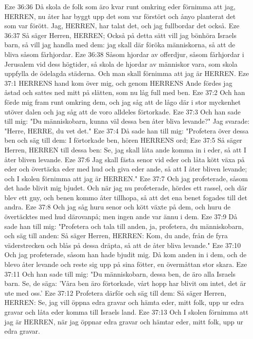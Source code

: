Eze 36:36  Då skola de folk som äro kvar runt omkring eder förnimma att jag, HERREN, nu åter har byggt upp det som var förstört och ånyo planterat det som var förött. Jag, HERREN, har talat det, och jag fullbordar det också.
Eze 36:37  Så säger Herren, HERREN; Också på detta sätt vill jag bönhöra Israels barn, så vill jag handla med dem: jag skall där föröka människorna, så att de bliva såsom fårhjordar.
Eze 36:38  Såsom hjordar av offerdjur, såsom fårhjordar i Jerusalem vid dess högtider, så skola de hjordar av människor vara, som skola uppfylla de ödelagda städerna. Och man skall förnimma att jag är HERREN.
Eze 37:1  HERRENS hand kom över mig, och genom HERRENS Ande fördes jag åstad och sattes ned mitt på slätten, som nu låg full med ben.
Eze 37:2  Och han förde mig fram runt omkring dem, och jag såg att de lågo där i stor myckenhet utöver dalen och jag såg att de voro alldeles förtorkade.
Eze 37:3  Och han sade till mig: "Du människobarn, kunna väl dessa ben åter bliva levande?" Jag svarade: "Herre, HERRE, du vet det."
Eze 37:4  Då sade han till mig: "Profetera över dessa ben och säg till dem: I förtorkade ben, hören HERRENS ord;
Eze 37:5  Så säger Herren, HERREN till dessa ben: Se, jag skall låta ande komma in i eder, så att I åter bliven levande.
Eze 37:6  Jag skall fästa senor vid eder och låta kött växa på eder och övertäcka eder med hud och giva eder ande, så att I åter bliven levande; och I skolen förnimma att jag är HERREN."
Eze 37:7  Och jag profeterade, såsom det hade blivit mig bjudet. Och när jag nu profeterade, hördes ett rassel, och där blev ett gny, och benen kommo åter tillhopa, så att det ena benet fogades till det andra.
Eze 37:8  Och jag såg huru senor och kött växte på dem, och huru de övertäcktes med hud därovanpå; men ingen ande var ännu i dem.
Eze 37:9  Då sade han till mig: "Profetera och tala till anden, ja, profetera, du människobarn, och säg till anden: Så säger Herren, HERREN: Kom, du ande, från de fyra väderstrecken och blås på dessa dräpta, så att de åter bliva levande."
Eze 37:10  Och jag profeterade, såsom han hade bjudit mig. Då kom anden in i dem, och de blevo åter levande och reste sig upp på sina fötter, en övermåttan stor skara.
Eze 37:11  Och han sade till mig: "Du människobarn, dessa ben, de äro alla Israels barn. Se, de säga: 'Våra ben äro förtorkade, vårt hopp har blivit om intet, det är ute med oss.'
Eze 37:12  Profetera därför och säg till dem: Så säger Herren, HERREN: Se, jag vill öppna edra gravar och hämta eder, mitt folk, upp ur edra gravar och låta eder komma till Israels land.
Eze 37:13  Och I skolen förnimma att jag är HERREN, när jag öppnar edra gravar och hämtar eder, mitt folk, upp ur edra gravar.
